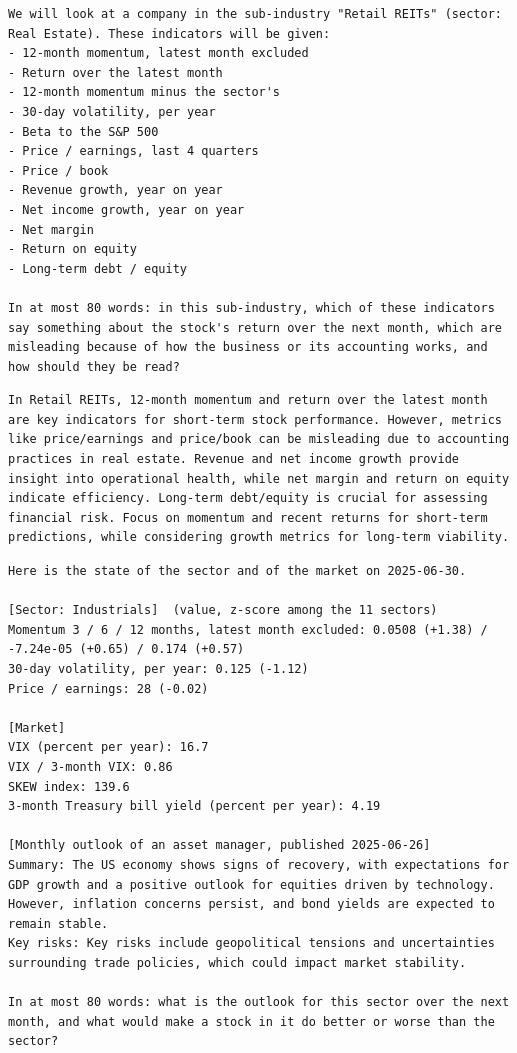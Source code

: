 \documentclass[xelatex,ja=standard,jafont=hiragino-pron,a4paper,10pt]{bxjsreport}
\begin{document}
\begin{lstlisting}[caption={ターン 1 の質問（Retail REITs）},label={lst:expF}]
We will look at a company in the sub-industry "Retail REITs" (sector: Real Estate). These indicators will be given:
- 12-month momentum, latest month excluded
- Return over the latest month
- 12-month momentum minus the sector's
- 30-day volatility, per year
- Beta to the S&P 500
- Price / earnings, last 4 quarters
- Price / book
- Revenue growth, year on year
- Net income growth, year on year
- Net margin
- Return on equity
- Long-term debt / equity

In at most 80 words: in this sub-industry, which of these indicators say something about the stock's return over the next month, which are misleading because of how the business or its accounting works, and how should they be read?
\end{lstlisting}
\begin{lstlisting}[caption={ターン1の回答}]
In Retail REITs, 12-month momentum and return over the latest month are key indicators for short-term stock performance. However, metrics like price/earnings and price/book can be misleading due to accounting practices in real estate. Revenue and net income growth provide insight into operational health, while net margin and return on equity indicate efficiency. Long-term debt/equity is crucial for assessing financial risk. Focus on momentum and recent returns for short-term predictions, while considering growth metrics for long-term viability.
\end{lstlisting}
\begin{lstlisting}[caption={ターン2の質問（Aerospace \& Defense、2025-06-30）}]
Here is the state of the sector and of the market on 2025-06-30.

[Sector: Industrials]  (value, z-score among the 11 sectors)
Momentum 3 / 6 / 12 months, latest month excluded: 0.0508 (+1.38) / -7.24e-05 (+0.65) / 0.174 (+0.57)
30-day volatility, per year: 0.125 (-1.12)
Price / earnings: 28 (-0.02)

[Market]
VIX (percent per year): 16.7
VIX / 3-month VIX: 0.86
SKEW index: 139.6
3-month Treasury bill yield (percent per year): 4.19

[Monthly outlook of an asset manager, published 2025-06-26]
Summary: The US economy shows signs of recovery, with expectations for GDP growth and a positive outlook for equities driven by technology. However, inflation concerns persist, and bond yields are expected to remain stable.
Key risks: Key risks include geopolitical tensions and uncertainties surrounding trade policies, which could impact market stability.

In at most 80 words: what is the outlook for this sector over the next month, and what would make a stock in it do better or worse than the sector?
\end{lstlisting}
\end{document}
